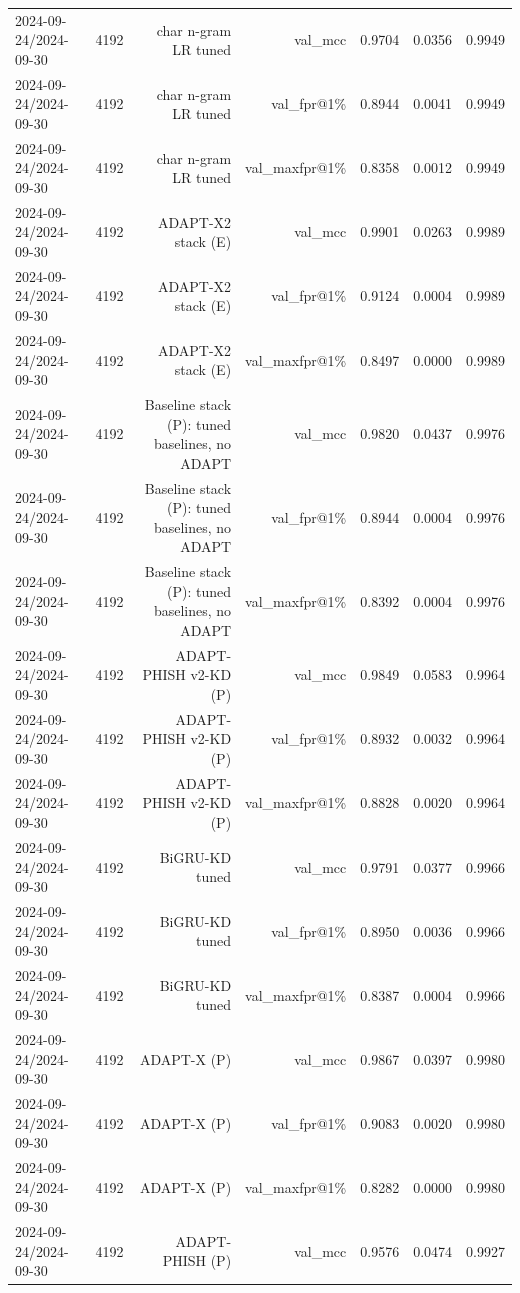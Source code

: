 \begin{table}[t]
\begin{tabular}{llrrrrr}
2024-09-24/2024-09-30 & 4192 & char n-gram LR tuned & val\_mcc & 0.9704 & 0.0356 & 0.9949 \\
2024-09-24/2024-09-30 & 4192 & char n-gram LR tuned & val\_fpr@1\% & 0.8944 & 0.0041 & 0.9949 \\
2024-09-24/2024-09-30 & 4192 & char n-gram LR tuned & val\_maxfpr@1\% & 0.8358 & 0.0012 & 0.9949 \\
2024-09-24/2024-09-30 & 4192 & ADAPT-X2 stack (E) & val\_mcc & 0.9901 & 0.0263 & 0.9989 \\
2024-09-24/2024-09-30 & 4192 & ADAPT-X2 stack (E) & val\_fpr@1\% & 0.9124 & 0.0004 & 0.9989 \\
2024-09-24/2024-09-30 & 4192 & ADAPT-X2 stack (E) & val\_maxfpr@1\% & 0.8497 & 0.0000 & 0.9989 \\
2024-09-24/2024-09-30 & 4192 & Baseline stack (P): tuned baselines, no ADAPT & val\_mcc & 0.9820 & 0.0437 & 0.9976 \\
2024-09-24/2024-09-30 & 4192 & Baseline stack (P): tuned baselines, no ADAPT & val\_fpr@1\% & 0.8944 & 0.0004 & 0.9976 \\
2024-09-24/2024-09-30 & 4192 & Baseline stack (P): tuned baselines, no ADAPT & val\_maxfpr@1\% & 0.8392 & 0.0004 & 0.9976 \\
2024-09-24/2024-09-30 & 4192 & ADAPT-PHISH v2-KD (P) & val\_mcc & 0.9849 & 0.0583 & 0.9964 \\
2024-09-24/2024-09-30 & 4192 & ADAPT-PHISH v2-KD (P) & val\_fpr@1\% & 0.8932 & 0.0032 & 0.9964 \\
2024-09-24/2024-09-30 & 4192 & ADAPT-PHISH v2-KD (P) & val\_maxfpr@1\% & 0.8828 & 0.0020 & 0.9964 \\
2024-09-24/2024-09-30 & 4192 & BiGRU-KD tuned & val\_mcc & 0.9791 & 0.0377 & 0.9966 \\
2024-09-24/2024-09-30 & 4192 & BiGRU-KD tuned & val\_fpr@1\% & 0.8950 & 0.0036 & 0.9966 \\
2024-09-24/2024-09-30 & 4192 & BiGRU-KD tuned & val\_maxfpr@1\% & 0.8387 & 0.0004 & 0.9966 \\
2024-09-24/2024-09-30 & 4192 & ADAPT-X (P) & val\_mcc & 0.9867 & 0.0397 & 0.9980 \\
2024-09-24/2024-09-30 & 4192 & ADAPT-X (P) & val\_fpr@1\% & 0.9083 & 0.0020 & 0.9980 \\
2024-09-24/2024-09-30 & 4192 & ADAPT-X (P) & val\_maxfpr@1\% & 0.8282 & 0.0000 & 0.9980 \\
2024-09-24/2024-09-30 & 4192 & ADAPT-PHISH (P) & val\_mcc & 0.9576 & 0.0474 & 0.9927 \\

\end{tabular}
\end{table}
